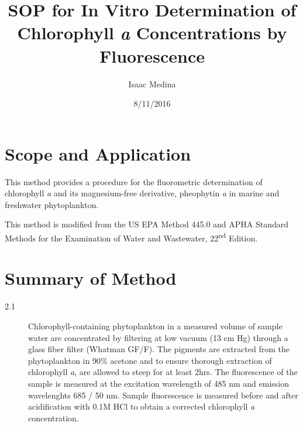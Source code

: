 \documentclass[12pt]{../SOP2}
\author{Isaac Medina}
\title{SOP for In Vitro Determination of Chlorophyll \textit{a} Concentrations by Fluorescence}
\date{8/11/2016}
\begin{document}


\maketitle

\section{Scope and Application}

\NP This method provides a procedure for the fluorometric determination of chlorophyll \textit{a} and its magnesium-free derivative, pheophytin \textit{a} in marine and freshwater phytoplankton.

\NP This method is modified from the US EPA Method 445.0 and APHA Standard Methods for the Examination of Water and Wastewater, 22\textsuperscript{nd} Edition. 


\section{Summary of Method}
\begin{description}
  \item[2.1] Chlorophyll-containing phytoplankton in a measured volume of sample water are concentrated by filtering at low vacuum (13 cm Hg) through a glass fiber filter (Whatman GF/F). The pigments are extracted from the phytoplankton in 90\% acetone and to ensure thorough extraction of chlorophyll \textit{a}, are allowed to steep for at least 2hrs. The fluorescence of the sample is measured at the excitation wavelength of 485 nm and emission wavelenghts 685 / 50 nm. Sample fluorescence is measured before and after acidification with 0.1M HCl to obtain a corrected chlorophyll \textit{a} concentration. 
\end{description}
\end{document}
